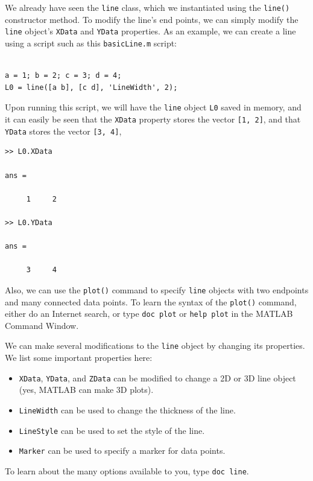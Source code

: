 We already have seen the \texttt{line} class, which we instantiated using the \texttt{line()} constructor method. To modify the line's end points, we can simply modify the \texttt{line} object's \texttt{XData} and \texttt{YData} properties. As an example, we can create a line using a script such as this \texttt{basicLine.m} script:
\begin{lstlisting}[style=Matlab-editor,label=basicLine,caption={Listing of the script \texttt{basicLine.m}.}]
% basicLine.m

a = 1; b = 2; c = 3; d = 4;
L0 = line([a b], [c d], 'LineWidth', 2);
\end{lstlisting}
Upon running this script, we will have the \texttt{line} object \texttt{L0} saved in memory, and it can easily be seen that the \texttt{XData} property stores the vector \verb![1, 2]!, and that \texttt{YData} stores the vector \verb![3, 4]!,
\begin{lstlisting}[style=Matlab-editor,label=basicLineCheck,caption={A Command Window verification of the \texttt{XData} and \texttt{YData} properties of the \texttt{L0} object created in Listing \ref{basicLine}.}]
>> L0.XData

ans =

     1     2

>> L0.YData

ans =

     3     4
\end{lstlisting}

Also, we can use the \texttt{plot()} command to specify \texttt{line} objects with two endpoints and many connected data points. To learn the syntax of the \texttt{plot()} command, either do an Internet search, or type \verb!doc plot! or \verb!help plot! in the MATLAB Command Window.

We can make several modifications to the \texttt{line} object by changing its properties. We list some important properties here:
\begin{itemize}
\item \texttt{XData}, \texttt{YData}, and \texttt{ZData} can be modified to change a 2D or 3D line object (yes, MATLAB can make 3D plots).
\item \texttt{LineWidth} can be used to change the thickness of the line.
\item \texttt{LineStyle} can be used to set the style of the line.
\item \texttt{Marker} can be used to specify a marker for data points.
\end{itemize}
To learn about the many options available to you, type \verb!doc line!.

